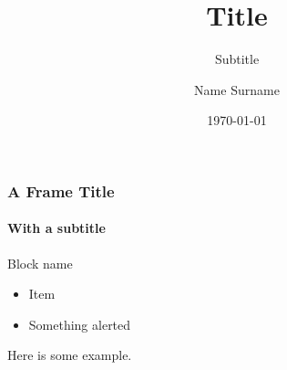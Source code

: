 \documentclass[10pt]{beamer}
\title{Title}
\subtitle{Subtitle}
\author[N. Surname]{Name Surname}
\institute[ShortConf]{Conference Name}
\date[\today]{\today}
\begin{document}
\begin{frame}[plain]
	\titlepage
\end{frame}

\begin{frame}
	\frametitle{A Frame Title}
	\framesubtitle{With a subtitle}
	\begin{block}{Block name}
	\begin{itemize}
		\item Item
		\item \alert{Something alerted}
	\end{itemize}
	\end{block}
	\begin{example}
		Here is some example.
	\end{example}
\end{frame}
\end{document}
